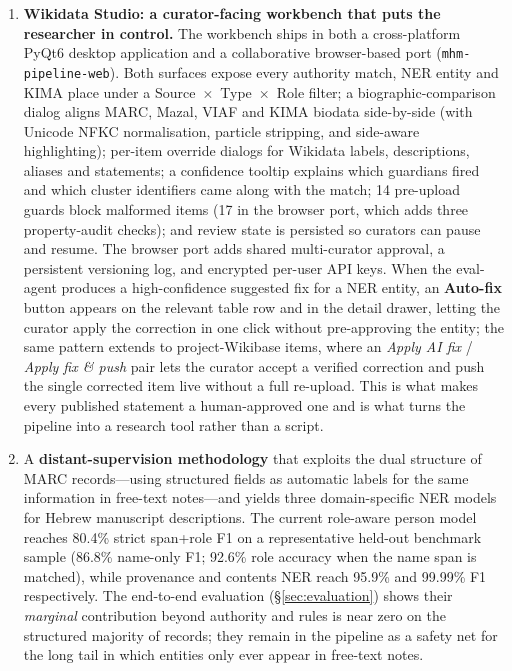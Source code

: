 \documentclass[Afour,sageh,times]{sagej}
\begin{document}
\begin{enumerate}[leftmargin=*]
\item \textbf{Wikidata Studio: a curator-facing workbench that puts the researcher in control.} The workbench ships in both a cross-platform PyQt6 desktop application and a collaborative browser-based port (\texttt{mhm-pipeline-web}). Both surfaces expose every authority match, NER entity and KIMA place under a Source~$\times$~Type~$\times$~Role filter; a biographic-comparison dialog aligns MARC, Mazal, VIAF and KIMA biodata side-by-side (with Unicode NFKC normalisation, particle stripping, and side-aware highlighting); per-item override dialogs for Wikidata labels, descriptions, aliases and statements; a confidence tooltip explains which guardians fired and which cluster identifiers came along with the match; 14 pre-upload guards block malformed items (17 in the browser port, which adds three property-audit checks); and review state is persisted so curators can pause and resume. The browser port adds shared multi-curator approval, a persistent versioning log, and encrypted per-user API keys. When the eval-agent produces a high-confidence suggested fix for a NER entity, an \textbf{Auto-fix} button appears on the relevant table row and in the detail drawer, letting the curator apply the correction in one click without pre-approving the entity; the same pattern extends to project-Wikibase items, where an \emph{Apply AI fix} / \emph{Apply fix \& push} pair lets the curator accept a verified correction and push the single corrected item live without a full re-upload. This is what makes every published statement a human-approved one and is what turns the pipeline into a research tool rather than a script.
\item A \textbf{distant-supervision methodology} that exploits the dual structure of MARC records---using structured fields as automatic labels for the same information in free-text notes---and yields three domain-specific NER models for Hebrew manuscript descriptions. The current role-aware person model reaches 80.4\% strict span+role F1 on a representative held-out benchmark sample (86.8\% name-only F1; 92.6\% role accuracy when the name span is matched), while provenance and contents NER reach 95.9\% and 99.99\% F1 respectively. The end-to-end evaluation (\S\ref{sec:evaluation}) shows their \emph{marginal} contribution beyond authority and rules is near zero on the structured majority of records; they remain in the pipeline as a safety net for the long tail in which entities only ever appear in free-text notes.

\end{enumerate}
\end{document}
